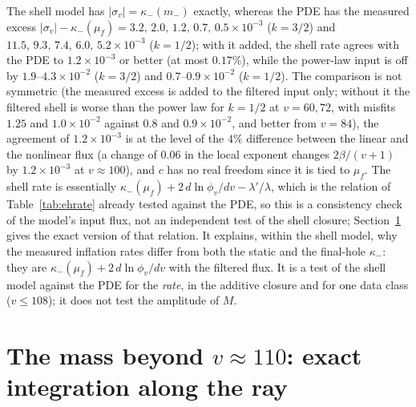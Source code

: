 \documentclass[11pt]{article}
\begin{document}
The shell model has $|\sigma_v|=\kappa_-(m_-)$ exactly, whereas the PDE has the measured excess $|\sigma_v|-\kappa_-(\mu_f)=3.2,\,2.0,\,1.2,\,0.7,\,0.5\times10^{-3}$ ($k=3/2$) and $11.5,\,9.3,\,7.4,\,6.0,\,5.2\times10^{-3}$ ($k=1/2$); with it added, the shell rate agrees with the PDE to $1.2\times10^{-3}$ or better (at most $0.17\%$), while the power-law input is off by $1.9$--$4.3\times10^{-2}$ ($k=3/2$) and $0.7$--$0.9\times10^{-2}$ ($k=1/2$). The comparison is not symmetric (the measured excess is added to the filtered input only; without it the filtered shell is worse than the power law for $k=1/2$ at $v=60,72$, with misfits $1.25$ and $1.0\times10^{-2}$ against $0.8$ and $0.9\times10^{-2}$, and better from $v=84$), the agreement of $1.2\times10^{-3}$ is at the level of the $4\%$ difference between the linear and the nonlinear flux (a change of $0.06$ in the local exponent changes $2\beta/(v+1)$ by $1.2\times10^{-3}$ at $v\approx100$), and $c$ has no real freedom since it is tied to $\mu_f$. The shell rate is essentially $\kappa_-(\mu_f)+2\,d\ln\phi_v/dv-\lambda'/\lambda$, which is the relation of Table~\ref{tab:ehrate} already tested against the PDE, so this is a consistency check of the model's input flux, not an independent test of the shell closure; Section~\ref{sec:ray} gives the exact version of that relation. It explains, within the shell model, why the measured inflation rates differ from both the static and the final-hole $\kappa_-$: they are $\kappa_-(\mu_f)+2\,d\ln\phi_v/dv$ with the filtered flux. It is a test of the shell model against the PDE for the \emph{rate}, in the additive closure and for one data class ($v\le108$); it does not test the amplitude of $M$.

\section{The mass beyond \texorpdfstring{$v\approx110$}{v ~ 110}: exact integration along the ray}
\label{sec:ray}
\end{document}

